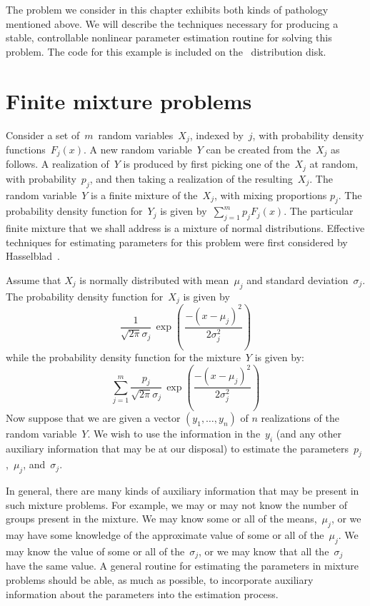 \documentclass{admbmanual}
\begin{document}
The problem we consider in this chapter exhibits both kinds of pathology
mentioned above. We will describe the techniques necessary for producing a
stable, controllable nonlinear parameter estimation routine for solving this
problem. The code for this example is included on the \scAD\ distribution disk.

\section{Finite mixture problems}
\label{sec:finite-mixture}

Consider a set of~$m$~random variables~$X_j$, indexed by~$j$, with probability
density functions~$F_j(x)$. A new random variable~$Y$ can be created from
the~$X_j$ as follows. A realization of~$Y$ is produced by first picking one of
the~$X_j$ at random, with probability~$p_j$, and then taking a realization of
the resulting~$X_j$. The random variable~$Y$ is a finite mixture of the~$X_j$,
with mixing proportions $p_j$. The probability density function for~$Y_j$ is
given by~$\sum_{j=1}^m p_jF_j(x)$. The particular finite mixture that we shall
address is a mixture of normal distributions. Effective techniques for
estimating parameters for this problem were first considered by
Hasselblad~\cite{hasselblad1966}.

Assume that $X_j$ is normally distributed with mean~$\mu_j$ and standard
deviation~$\sigma_j$. The probability density function for~$X_j$ is given by
\begin{equation*}
  \frac{1}{\sqrt{2\pi}\sigma_j}\,
  \exp\left(\, \frac{-(x-\mu_j)^2}{2\sigma_j^2}\right)
\end{equation*}
while the probability density function for the mixture~$Y$ is given by:
\begin{equation*}
  \sum_{j=1}^m \frac{p_j}{\sqrt{2\pi}\sigma_j}
                        \,\exp\left(\frac{-(x-\mu_j)^2}{2\sigma_j^2}\right)
\end{equation*}
Now suppose that we are given a vector $(y_1,\ldots,y_n)$ of $n$ realizations of
the random variable~$Y$. We wish to use the information in the~$y_i$ (and any
other auxiliary information that may be at our disposal) to estimate the
parameters~$p_j$,~$\mu_j$, and~$\sigma_j$.

In general, there are many kinds of auxiliary information that may be present in
such mixture problems. For example, we may or may not know the number of groups
present in the mixture. We may know some or all of the means,~$\mu_j$, or we may
have some knowledge of the approximate value of some or all of the~$\mu_j$. We
may know the value of some or all of the~$\sigma_j$, or we may know that all
the~$\sigma_j$ have the same value. A general routine for estimating the
parameters in mixture problems should be able, as much as possible, to
incorporate auxiliary information about the parameters into the estimation
process.
\end{document}
